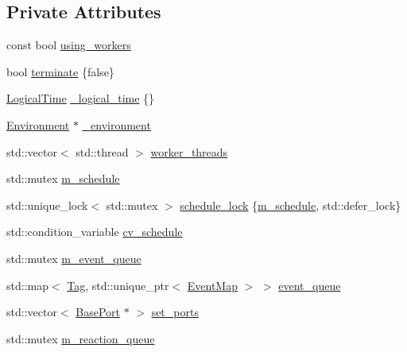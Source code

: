 \subsection*{Private Attributes}
\begin{DoxyCompactItemize}
\item 
const bool \hyperlink{classreactor_1_1Scheduler_ac4b787be81d8b6d7a72ce987d24a2261}{using\+\_\+workers}
\item 
bool \hyperlink{classreactor_1_1Scheduler_a25e5b848efc680452eef58a0fc0b773c}{terminate} \{false\}
\item 
\hyperlink{classreactor_1_1LogicalTime}{Logical\+Time} \hyperlink{classreactor_1_1Scheduler_a68b0b490d08d5db7890c337d4250ad1c}{\+\_\+logical\+\_\+time} \{\}
\item 
\hyperlink{classreactor_1_1Environment}{Environment} $\ast$ \hyperlink{classreactor_1_1Scheduler_a7c9c2365d7b10cedb335c81d14610149}{\+\_\+environment}
\item 
std\+::vector$<$ std\+::thread $>$ \hyperlink{classreactor_1_1Scheduler_aad3a17b14df9166b175a3d5baf5afd14}{worker\+\_\+threads}
\item 
std\+::mutex \hyperlink{classreactor_1_1Scheduler_adbf93f069a826ffe49c8d890c5af8ff3}{m\+\_\+schedule}
\item 
std\+::unique\+\_\+lock$<$ std\+::mutex $>$ \hyperlink{classreactor_1_1Scheduler_a338d396352878baec7c8ecd2e1e7b202}{schedule\+\_\+lock} \{\hyperlink{classreactor_1_1Scheduler_adbf93f069a826ffe49c8d890c5af8ff3}{m\+\_\+schedule}, std\+::defer\+\_\+lock\}
\item 
std\+::condition\+\_\+variable \hyperlink{classreactor_1_1Scheduler_a75e7baf3e6f17cedca2f23690af7b61d}{cv\+\_\+schedule}
\item 
std\+::mutex \hyperlink{classreactor_1_1Scheduler_a2ff891940d9bc4af41858e1c31ec2922}{m\+\_\+event\+\_\+queue}
\item 
std\+::map$<$ \hyperlink{classreactor_1_1Tag}{Tag}, std\+::unique\+\_\+ptr$<$ \hyperlink{classreactor_1_1Scheduler_aa32e06a71b7406a238616cc5d7b55610}{Event\+Map} $>$ $>$ \hyperlink{classreactor_1_1Scheduler_aad84798ec7af707837594ed335532829}{event\+\_\+queue}
\item 
std\+::vector$<$ \hyperlink{classreactor_1_1BasePort}{Base\+Port} $\ast$ $>$ \hyperlink{classreactor_1_1Scheduler_a19bbe962eab2b7a6c4a25312e4479739}{set\+\_\+ports}
\item 
std\+::mutex \hyperlink{classreactor_1_1Scheduler_a3f06ec50b64251aeca469a137b3fdf9b}{m\+\_\+reaction\+\_\+queue}
\item 

\end{DoxyCompactItemize}
